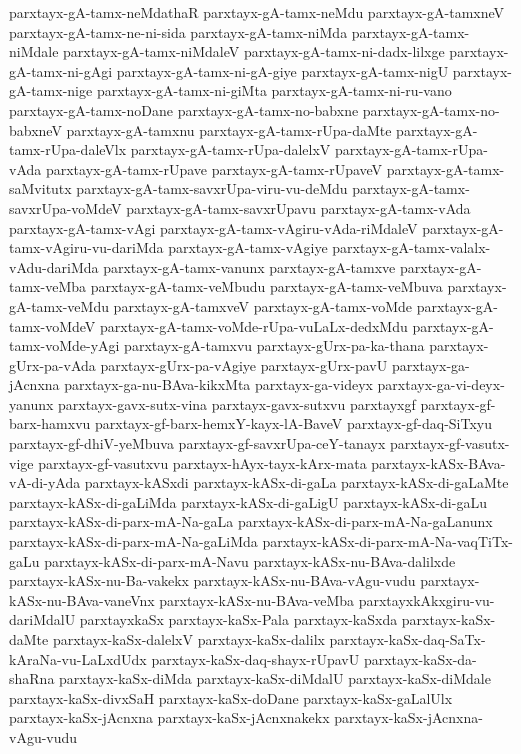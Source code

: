 {parxtayx-gA-tamx-neMdathaR
parxtayx-gA-tamx-neMdu
parxtayx-gA-tamxneV
parxtayx-gA-tamx-ne-ni-sida
parxtayx-gA-tamx-niMda
parxtayx-gA-tamx-niMdale
parxtayx-gA-tamx-niMdaleV
parxtayx-gA-tamx-ni-dadx-lilxge
parxtayx-gA-tamx-ni-gAgi
parxtayx-gA-tamx-ni-gA-giye
parxtayx-gA-tamx-nigU
parxtayx-gA-tamx-nige
parxtayx-gA-tamx-ni-giMta
parxtayx-gA-tamx-ni-ru-vano
parxtayx-gA-tamx-noDane
parxtayx-gA-tamx-no-babxne
parxtayx-gA-tamx-no-babxneV
parxtayx-gA-tamxnu
parxtayx-gA-tamx-rUpa-daMte
parxtayx-gA-tamx-rUpa-daleVlx
parxtayx-gA-tamx-rUpa-dalelxV
parxtayx-gA-tamx-rUpa-vAda
parxtayx-gA-tamx-rUpave
parxtayx-gA-tamx-rUpaveV
parxtayx-gA-tamx-saMvitutx
parxtayx-gA-tamx-savxrUpa-viru-vu-deMdu
parxtayx-gA-tamx-savxrUpa-voMdeV
parxtayx-gA-tamx-savxrUpavu
parxtayx-gA-tamx-vAda
parxtayx-gA-tamx-vAgi
parxtayx-gA-tamx-vAgiru-vAda-riMdaleV
parxtayx-gA-tamx-vAgiru-vu-dariMda
parxtayx-gA-tamx-vAgiye
parxtayx-gA-tamx-valalx-vAdu-dariMda
parxtayx-gA-tamx-vanunx
parxtayx-gA-tamxve
parxtayx-gA-tamx-veMba
parxtayx-gA-tamx-veMbudu
parxtayx-gA-tamx-veMbuva
parxtayx-gA-tamx-veMdu
parxtayx-gA-tamxveV
parxtayx-gA-tamx-voMde
parxtayx-gA-tamx-voMdeV
parxtayx-gA-tamx-voMde-rUpa-vuLaLx-dedxMdu
parxtayx-gA-tamx-voMde-yAgi
parxtayx-gA-tamxvu
parxtayx-gUrx-pa-ka-thana
parxtayx-gUrx-pa-vAda
parxtayx-gUrx-pa-vAgiye
parxtayx-gUrx-pavU
parxtayx-ga-jAcnxna
parxtayx-ga-nu-BAva-kikxMta
parxtayx-ga-videyx
parxtayx-ga-vi-deyx-yanunx
parxtayx-gavx-sutx-vina
parxtayx-gavx-sutxvu
parxtayxgf
parxtayx-gf-barx-hamxvu
parxtayx-gf-barx-hemxY-kayx-lA-BaveV
parxtayx-gf-daq-SiTxyu
parxtayx-gf-dhiV-yeMbuva
parxtayx-gf-savxrUpa-ceY-tanayx
parxtayx-gf-vasutx-vige
parxtayx-gf-vasutxvu
parxtayx-hAyx-tayx-kArx-mata
parxtayx-kASx-BAva-vA-di-yAda
parxtayx-kASxdi
parxtayx-kASx-di-gaLa
parxtayx-kASx-di-gaLaMte
parxtayx-kASx-di-gaLiMda
parxtayx-kASx-di-gaLigU
parxtayx-kASx-di-gaLu
parxtayx-kASx-di-parx-mA-Na-gaLa
parxtayx-kASx-di-parx-mA-Na-gaLanunx
parxtayx-kASx-di-parx-mA-Na-gaLiMda
parxtayx-kASx-di-parx-mA-Na-vaqTiTx-gaLu
parxtayx-kASx-di-parx-mA-Navu
parxtayx-kASx-nu-BAva-dalilxde
parxtayx-kASx-nu-Ba-vakekx
parxtayx-kASx-nu-BAva-vAgu-vudu
parxtayx-kASx-nu-BAva-vaneVnx
parxtayx-kASx-nu-BAva-veMba
parxtayxkAkxgiru-vu-dariMdalU
parxtayxkaSx
parxtayx-kaSx-Pala
parxtayx-kaSxda
parxtayx-kaSx-daMte
parxtayx-kaSx-dalelxV
parxtayx-kaSx-dalilx
parxtayx-kaSx-daq-SaTx-kAraNa-vu-LaLxdUdx
parxtayx-kaSx-daq-shayx-rUpavU
parxtayx-kaSx-da-shaRna
parxtayx-kaSx-diMda
parxtayx-kaSx-diMdalU
parxtayx-kaSx-diMdale
parxtayx-kaSx-divxSaH
parxtayx-kaSx-doDane
parxtayx-kaSx-gaLalUlx
parxtayx-kaSx-jAcnxna
parxtayx-kaSx-jAcnxnakekx
parxtayx-kaSx-jAcnxna-vAgu-vudu
}

